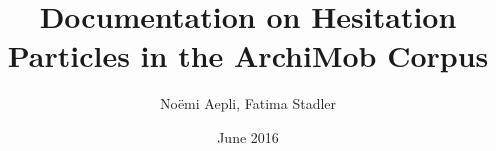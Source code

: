 \documentclass{article}
\title{Documentation on Hesitation Particles in the ArchiMob Corpus}
\author{Noëmi Aepli, Fatima Stadler}
\date{June 2016}
\begin{document}
\maketitle

\section{}
\end{document}
